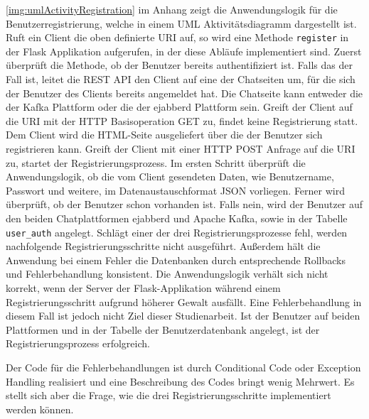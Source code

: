 \documentclass[a4paper,titlepage,halfparskip,12pt]{scrreprt}
\begin{document}
\begin{onehalfspacing}
\autoref{img:umlActivityRegistration} im Anhang zeigt die Anwendungslogik für die Benutzerregistrierung, welche in einem \acs{UML} Aktivitätsdiagramm dargestellt ist. Ruft ein Client die oben definierte \acs{URI} auf, so wird eine Methode \texttt{register} in der Flask Applikation aufgerufen, in der diese Abläufe implementiert sind. Zuerst überprüft die Methode, ob der Benutzer bereits authentifiziert ist. Falls das der Fall ist, leitet die \acs{REST} \acs{API} den Client auf eine der Chatseiten um, für die sich der Benutzer des Clients bereits angemeldet hat. Die Chatseite kann entweder die der Kafka Plattform oder die der ejabberd Plattform sein. Greift der Client auf die \acs{URI} mit der \acs{HTTP} Basisoperation GET zu, findet keine Registrierung statt. Dem Client wird die \acs{HTML}-Seite ausgeliefert über die der Benutzer sich registrieren kann. Greift der Client mit einer \acs{HTTP} POST Anfrage auf die \acs{URI} zu, startet der Registrierungsprozess. Im ersten Schritt überprüft die Anwendungslogik, ob die vom Client gesendeten Daten, wie Benutzername, Passwort und weitere, im Datenaustauschformat \acs{JSON} vorliegen. Ferner wird überprüft, ob der Benutzer schon vorhanden ist. Falls nein, wird der Benutzer auf den beiden Chatplattformen ejabberd und Apache Kafka, sowie in der Tabelle \texttt{user\_auth} angelegt. Schlägt einer der drei Registrierungsprozesse fehl, werden nachfolgende Registrierungsschritte nicht ausgeführt. Außerdem hält die Anwendung bei einem Fehler die Datenbanken durch entsprechende Rollbacks und Fehlerbehandlung konsistent. Die Anwendungslogik verhält sich nicht korrekt, wenn der Server der Flask-Applikation während einem Registrierungsschritt aufgrund höherer Gewalt ausfällt. Eine Fehlerbehandlung in diesem Fall ist jedoch nicht Ziel dieser Studienarbeit. Ist der Benutzer auf beiden Plattformen und in der Tabelle der Benutzerdatenbank angelegt, ist der Registrierungsprozess erfolgreich.

Der Code für die Fehlerbehandlungen ist durch Conditional Code oder Exception Handling realisiert und eine Beschreibung des Codes bringt wenig Mehrwert. Es stellt sich aber die Frage, wie die drei Registrierungsschritte implementiert werden können.


\end{onehalfspacing}
\end{document}
